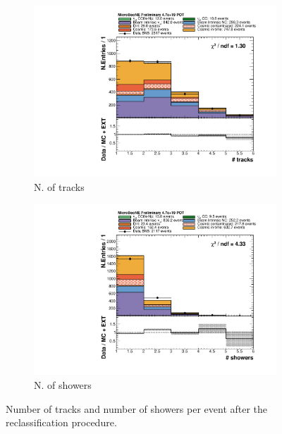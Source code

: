\begin{figure}[htbp]
\centering
  \begin{subfigure}{0.45\textwidth}
    \includegraphics[width=\linewidth]{figures/h_n_tracks.pdf}
    \caption{N. of tracks} 
  \end{subfigure}
    \begin{subfigure}{0.45\textwidth}
    \includegraphics[width=\linewidth]{figures/h_n_showers.pdf}
    \caption{N. of showers} 
  \end{subfigure}
  \caption{Number of tracks and number of showers per event after the reclassification procedure.}\label{fig:nshowers_after}
\end{figure}

